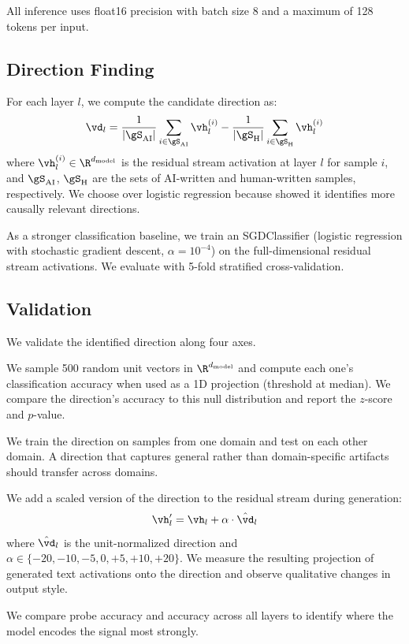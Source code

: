 All inference uses float16 precision with batch size 8 and a maximum of 128 tokens per input.

\subsection{Direction Finding}
\label{sec:directions}

For each layer $l$, we compute the candidate \aistyle direction as:
\begin{equation}
    \vd_l = \frac{1}{|\gS_\text{AI}|} \sum_{i \in \gS_\text{AI}} \vh_l^{(i)} - \frac{1}{|\gS_\text{H}|} \sum_{i \in \gS_\text{H}} \vh_l^{(i)}
    \label{eq:diffmean}
\end{equation}
where $\vh_l^{(i)} \in \R^{d_\text{model}}$ is the residual stream activation at layer $l$ for sample $i$, and $\gS_\text{AI}$, $\gS_\text{H}$ are the sets of AI-written and human-written samples, respectively.
We choose \diffmean over logistic regression because \citet{marks2024geometry} showed it identifies more causally relevant directions.

As a stronger classification baseline, we train an SGDClassifier (logistic regression with stochastic gradient descent, $\alpha = 10^{-4}$) on the full-dimensional residual stream activations.
We evaluate with 5-fold stratified cross-validation.

\subsection{Validation}
\label{sec:validation}

We validate the identified direction along four axes.

We sample 500 random unit vectors in $\R^{d_\text{model}}$ and compute each one's classification accuracy when used as a 1D projection (threshold at median).
We compare the \diffmean direction's accuracy to this null distribution and report the $z$-score and $p$-value.

We train the \diffmean direction on samples from one domain and test on each other domain.
A direction that captures general \aistyle rather than domain-specific artifacts should transfer across domains.

We add a scaled version of the \diffmean direction to the residual stream during generation:
\begin{equation}
    \vh_l' = \vh_l + \alpha \cdot \hat{\vd}_l
    \label{eq:steering}
\end{equation}
where $\hat{\vd}_l$ is the unit-normalized direction and $\alpha \in \{-20, -10, -5, 0, +5, +10, +20\}$.
We measure the resulting projection of generated text activations onto the direction and observe qualitative changes in output style.

We compare probe accuracy and \diffmean accuracy across all layers to identify where the model encodes the \aistyle signal most strongly.
